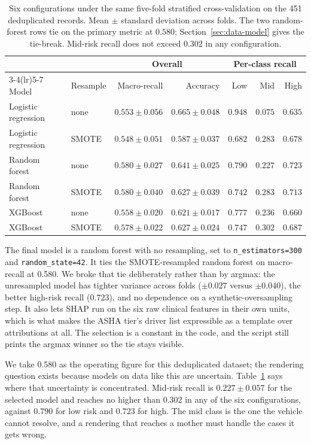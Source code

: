 \begin{table}[t]
\centering
\footnotesize
\caption{Six configurations under the same five-fold stratified
cross-validation on the 451 deduplicated records. Mean $\pm$ standard
deviation across folds. The two random-forest rows tie on the primary metric
at $0.580$; Section~\ref{sec:data-model} gives the tie-break. Mid-risk recall
does not exceed $0.302$ in any configuration.}
\label{tab:models}
\begin{tabular}{llrrrrr}
\toprule
 & & \multicolumn{2}{c}{Overall} & \multicolumn{3}{c}{Per-class recall} \\
\cmidrule(lr){3-4}\cmidrule(lr){5-7}
Model & Resample & Macro-recall & Accuracy & Low & Mid & High \\
\midrule
Logistic regression & none  & $0.553 \pm 0.056$ & $0.665 \pm 0.048$ & $0.948$ & $0.075$ & $0.635$ \\
Logistic regression & SMOTE & $0.548 \pm 0.051$ & $0.587 \pm 0.037$ & $0.682$ & $0.283$ & $0.678$ \\
Random forest       & none  & $\mathbf{0.580} \pm 0.027$ & $0.641 \pm 0.025$ & $0.790$ & $0.227$ & $0.723$ \\
Random forest       & SMOTE & $\mathbf{0.580} \pm 0.040$ & $0.627 \pm 0.039$ & $0.742$ & $0.283$ & $0.713$ \\
XGBoost             & none  & $0.558 \pm 0.020$ & $0.621 \pm 0.017$ & $0.777$ & $0.236$ & $0.660$ \\
XGBoost             & SMOTE & $0.578 \pm 0.022$ & $0.627 \pm 0.024$ & $0.747$ & $0.302$ & $0.687$ \\
\bottomrule
\end{tabular}
\end{table}

The final model is a random forest with no resampling, set to
\texttt{n\_estimators=300} and \texttt{random\_state=42}. It ties the
SMOTE-resampled random forest on macro-recall at 0.580. We broke that tie
deliberately rather than by argmax: the unresampled model has tighter
variance across folds ($\pm 0.027$ versus $\pm 0.040$), the better high-risk
recall (0.723), and no dependence on a synthetic-oversampling step. It also lets SHAP run on the six raw clinical features in their own
units, which is what makes the ASHA tier's driver list expressible as a
template over attributions at all. The selection is a constant in the code, and the
script still prints the argmax winner so the tie stays visible.

We take 0.580 as the operating figure for this deduplicated dataset; the
rendering question exists because models on data like this are
uncertain. Table~\ref{tab:models} says where that uncertainty is concentrated.
Mid-risk recall is $0.227 \pm 0.057$ for the selected model and reaches no
higher than $0.302$ in any of the six configurations, against $0.790$ for low
risk and $0.723$ for high. The mid class is the one the vehicle cannot
resolve, and a rendering that reaches a mother must handle the cases it gets
wrong.

